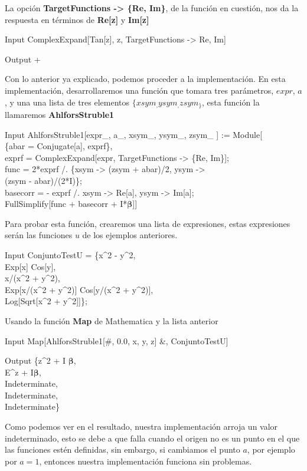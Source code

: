 La opción \textbf{TargetFunctions -> \{Re, Im\}}, de la función en cuestión, nos da la respuesta en términos de \textbf{Re[z]} y \textbf{Im[z]}

\begin{mmaCell}{Input}
	 ComplexExpand[Tan[z], {z}, TargetFunctions -> {Re, Im}]
\end{mmaCell}

\begin{mmaCell}{Output}
	  +\\ 
\end{mmaCell}
Con lo anterior ya explicado, podemos proceder a la implementación. En esta implementación, desarrollaremos una función que tomara tres parámetros, $expr$, $a$, y una una lista de tres elementos $\{xsym_, ysym_, zsym_ \}$, esta función la llamaremos \textbf{AhlforsStruble1}

\begin{mmaCell}{Input}
	 AhlforsStruble1[expr_, a_, {xsym_, ysym_, zsym_ }] := Module[\\ \{abar = Conjugate[a], exprf\},\\ exprf = ComplexExpand[expr, TargetFunctions -> \{Re, Im\}];\\ func = 2*exprf /. \{xsym -> (zsym + abar)/2, ysym ->\\ (zsym - abar)/(2*I)\};\\ basecorr =  - exprf /. {xsym -> Re[a], ysym -> Im[a]};\\ FullSimplify[func + basecorr + I*\(\pmb{\beta}\)]]
\end{mmaCell}
\noindent Para probar esta función, crearemos una lista de expresiones, estas expresiones serán las funciones  $u$ de los ejemplos anteriores.

\begin{mmaCell}{Input}
	 ConjuntoTestU = \{x^2 - y^2,\\ Exp[x] Cos[y],\\ x/(x^2 + y^2),\\ Exp[x/(x^2 + y^2)] Cos[y/(x^2 + y^2)],\\ Log[Sqrt[x^2 + y^2]]\};
\end{mmaCell}
Usando la función \textbf{Map} de Mathematica y la lista anterior
\begin{mmaCell}{Input}
	  Map[AhlforsStruble1[#, 0.0, {x, y, z}] &, ConjuntoTestU]
\end{mmaCell}
\begin{mmaCell}{Output}
	 \{z^2 + I \(\pmb{\beta}\),\\ E^z + I\(\pmb{\beta}\),\\ Indeterminate,\\ Indeterminate,\\ Indeterminate\}
\end{mmaCell}
\noindent Como podemos ver en el resultado, nuestra implementación arroja un valor indeterminado, esto se debe a que falla cuando el origen no es un punto en el que las funciones estén definidas, sin embargo, si cambiamos el punto $a$, por ejemplo por $a=1$, entonces nuestra implementación funciona sin problemas.

